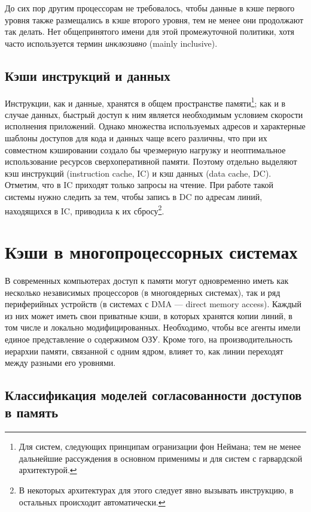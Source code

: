 До сих пор другим процессорам не требовалось, чтобы данные в кэше первого уровня также размещались в кэше второго уровня, тем не менее они продолжают так делать. Нет общепринятого имени для этой промежуточной политики, хотя часто используется термин \textit{инклюзивно} (\abbr mainly inclusive).

\subsection{Кэши инструкций и данных}

Инструкции, как и данные, хранятся в общем пространстве памяти\footnote{Для систем, следующих принципам огранизации фон Неймана; тем не менее дальнейшие рассуждения в основном применимы и для систем с гарвардской архитектурой.}; как и в случае данных, быстрый доступ к ним является необходимым условием скорости исполнения приложений. Однако множества используемых адресов и характерные шаблоны доступов для кода и данных чаще всего различны, что при их совместном кэшировании создало бы чрезмерную нагрузку и неоптимальное использование ресурсов сверх\-опера\-тивной памяти. Поэтому отдельно выделяют кэш инструкций (\abbr instruction cache, IC) и кэш данных (\abbr data cache, DC). Отметим, что в IC приходят только запросы на чтение. При работе такой системы нужно следить за тем, чтобы запись в DC по адресам линий, находящихся в IC, приводила к их сбросу\footnote{В некоторых архитектурах для этого следует явно вызывать инструкцию, в остальных происходит автоматически.}.

\section{Кэши в многопроцессорных системах}

В современных компьютерах доступ к памяти могут одновременно иметь как несколько независимых процессоров (в многоядерных системах), так и ряд периферийных устройств (в системах с DMA — \abbr direct memory access). Каждый из них может иметь свои приватные кэши, в которых хранятся копии линий, в том числе и локально модифицированных.  Необходимо, чтобы все агенты имели единое представление о содержимом ОЗУ. Кроме того, на производительность иерархии памяти, связанной с одним ядром, влияет то, как линии переходят между разными его уровнями.

\subsection[Классификация моделей согласованности]{Классификация моделей согласованности доступов в память}


